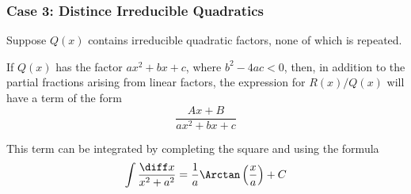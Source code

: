 \begin{frame}\frametitle{Case 3: Distince Irreducible Quadratics}
Suppose $Q(x)$ contains irreducible quadratic factors, none of which is repeated.

If $Q(x)$ has the factor $ax^2 + bx + c$, where $b^2-4ac < 0$, then, in addition to the partial fractions arising from linear factors, the expression for $R(x)/Q(x)$ will have a term of the form
\[
\frac{Ax+B}{ax^2+bx+c}
\]

This term can be integrated by completing the square and using the formula
\[
\int \frac{\diff x}{x^2+a^2} = \frac{1}{a} \Arctan \left( \frac{x}{a}\right) + C
\]
\end{frame}
